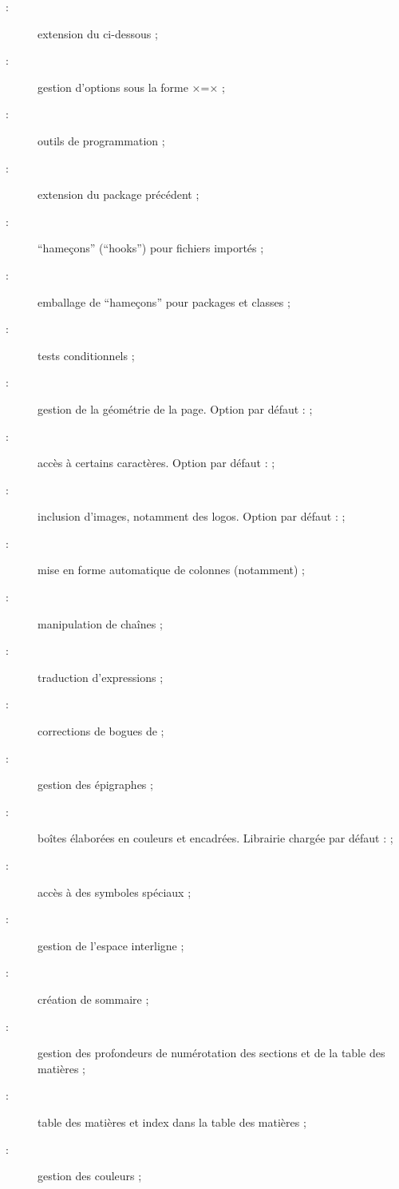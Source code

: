 \begin{description}
\item[ :] extension du  ci-dessous ;
\item[ :] gestion d'options sous la forme
  ×=× ;
\item[ :] outils de programmation ;
\item[ :] extension du package précédent ;
\item[ :] \enquote{hameçons} (\foreignquote{english}{hooks})
  pour fichiers importés ;
\item[ :] emballage de \enquote{hameçons} pour packages et classes ;
\item[ :] tests conditionnels ;
\item[ :] gestion de la géométrie de la page.
  Option par défaut :  ;
\item[ :] accès à certains caractères. Option par défaut :
   ;
\item[ :] inclusion d'images, notamment des logos.
  Option par défaut :  ;
\item[ :] mise en forme automatique de colonnes (notamment) ;
\item[ :] manipulation de chaînes ;
\item[ :] traduction d'expressions ;
\item[ :] corrections de bogues de  ;
\item[ :] gestion des épigraphes ;
\item[ :] boîtes élaborées en couleurs et
  encadrées. Librairie chargée par défaut :  ;
\item[ :] accès à des symboles spéciaux ;
\item[ :] gestion de l'espace interligne ;
\item[ :] création de sommaire ;
\item[ :] gestion des profondeurs de numérotation des
  sections et de la table des matières ;
\item[ :] table des matières et index dans la
  table des matières ;
\item[ :] gestion des couleurs ;

\end{description}

